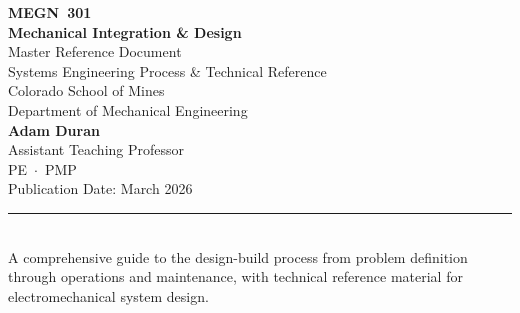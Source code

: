 \begin{titlepage}
\begin{center}
\vspace*{2cm}
{\Huge\bfseries\sffamily\textcolor{MinesBlue}{MEGN~301}}\\[0.5cm]
{\Huge\bfseries\sffamily\textcolor{MinesBlue}{Mechanical Integration \& Design}}\\[2cm]
{\huge\sffamily\textcolor{MinesBlue}{Master Reference Document}}\\[1cm]
{\Large\sffamily Systems Engineering Process \& Technical Reference}\\[3cm]
{\large\sffamily\textcolor{MinesSilver}{Colorado School of Mines}}\\[0.3cm]
{\large\sffamily\textcolor{MinesSilver}{Department of Mechanical Engineering}}\\[1.5cm]
{\Large\sffamily\textbf{Adam Duran}}\\[0.2cm]
{\normalsize\sffamily Assistant Teaching Professor}\\[0.2cm]
{\normalsize\sffamily\textcolor{MinesSilver}{PE \,$\cdot$\, PMP}}\\[1.5cm]
{\normalsize\sffamily\textcolor{MinesSilver}{Publication Date: March 2026}}\\[0.8cm]
\textcolor{MinesBlue}{\rule{0.6\textwidth}{1pt}}\\[0.5cm]
{\normalsize\sffamily A comprehensive guide to the design-build process from problem definition through operations and maintenance, with technical reference material for electromechanical system design.}
\end{center}
\end{titlepage}
